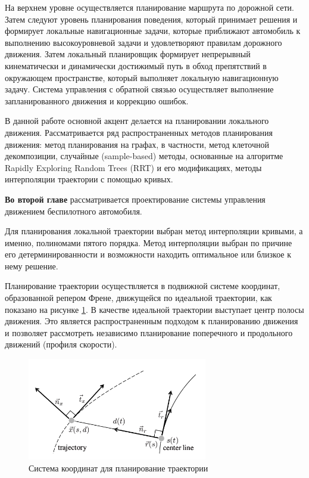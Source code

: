 На верхнем уровне осуществляется планирование маршрута по дорожной сети. Затем следуют уровень планирования
поведения, который принимает решения и формирует локальные навигационные задачи, которые приближают автомобиль
к выполнению высокоуровневой задачи и удовлетворяют правилам дорожного движения. Затем локальный планировщик
формирует непрерывный кинематически и динамически достижимый путь в обход препятствий в окружающем пространстве,
который выполняет локальную навигационную задачу. Система управления с обратной связью осуществляет выполнение
запланированного движения и коррекцию ошибок.

В данной работе основной акцент делается на планировании локального движения. Рассматривается ряд распространенных
методов планирования движения: метод планирования на графах, в частности, метод клеточной декомпозиции, случайные
(sample-based) методы, основанные на алгоритме Rapidly Exploring Random Trees (RRT) и его модификациях, методы
интерполяции траектории с помощью кривых.

\textbf{Во второй главе} рассматривается проектирование системы управления движением беспилотного автомобиля.

Для планирования локальной траектории выбран метод интерполяции кривыми, а именно, полиномами
пятого порядка. Метод интерполяции выбран по причине его детерминированности и возможности находить оптимальное
или близкое к нему решение.

Планирование траектории осуществляется в подвижной системе координат, образованной репером Френе,
движущейся по идеальной траектории, как показано на рисунке \ref{img:junior_frenet_frame}. В качестве
идеальной траектории  выступает центр полосы движения. Это является распространенным подходом к
планированию движения и позволяет рассмотреть независимо планирование поперечного и
продольного движений (профиля скорости).

\begin{figure}[h]
    \centering
    \includegraphics[width=0.7\textwidth]{images/junior_frenet_frame}
    \caption{Система координат для планирование траектории}
    \label{img:junior_frenet_frame}
\end{figure}

